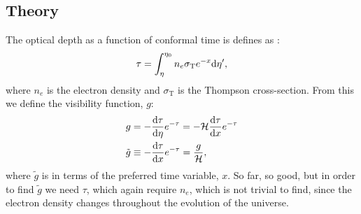 \subsection{Theory}\label{sec:m2:theory}
    The optical depth as a function of conformal time is defines as \cite{AST5220LectureNotes}:
    \begin{equation}\label{eq:m2:theory:optical_depth}
        \tau = \int_\eta^{\eta_0} n_e\sigma_\mathrm{T}e^{-x}\mathrm{d}\eta',
    \end{equation}
    where $n_e$ is the electron density and $\sigma_\mathrm{T}$ is the Thompson cross-section. From this we define the visibility function, $g$:
    \begin{equation}
        \begin{split}
            g &= -\dv{\tau}{\eta}e^{-\tau} = -\mathcal{H}\dv{\tau}{x}e^{-\tau}\\
            \tilde{g} &\equiv -\dv{\tau}{x}e^{-\tau} = \frac{g}{\mathcal{H}},
        \end{split}
    \end{equation}
    where $\tilde{g}$ is in terms of the preferred time variable, $x$. So far, so good, but in order to find $\tilde{g}$ we need $\tau$, which again require $n_e$, which is not trivial to find, since the electron density changes throughout the evolution of the universe.
    
